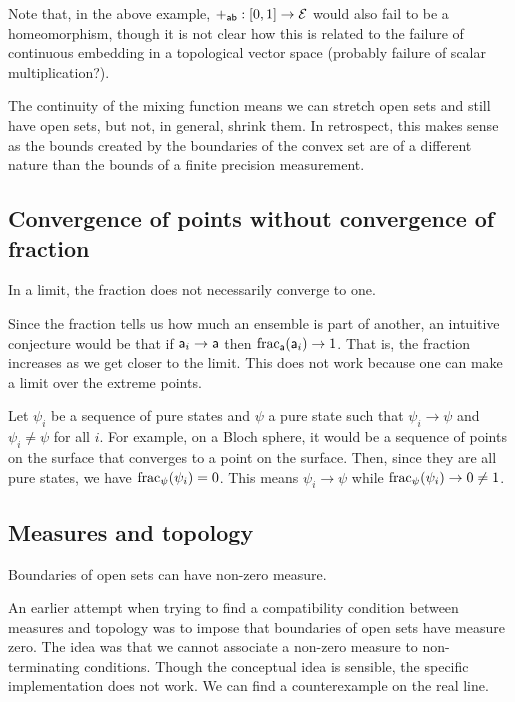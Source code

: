 Note that, in the above example, $+_{\ens[a]\ens[b]} : [0,1] \to \Ens$ would also fail to be a homeomorphism, though it is not clear how this is related to the failure of continuous embedding in a topological vector space (probably failure of scalar multiplication?).

The continuity of the mixing function means we can stretch open sets and still have open sets, but not, in general, shrink them. In retrospect, this makes sense as the bounds created by the boundaries of the convex set are of a different nature than the bounds of a finite precision measurement.

\subsection{Convergence of points without convergence of fraction}

\begin{insight}
	In a limit, the fraction does not necessarily converge to one.
\end{insight}

Since the fraction tells us how much an ensemble is part of another, an intuitive conjecture would be that if $\ens[a]_i \to \ens[a]$ then $\fraction_{\ens[a]}(\ens[a]_i) \to 1$. That is, the fraction increases as we get closer to the limit. This does not work because one can make a limit over the extreme points.

\begin{example}
	Let $\psi_i$ be a sequence of pure states and $\psi$ a pure state such that $\psi_i \to \psi$ and $\psi_i \neq \psi$ for all $i$. For example, on a Bloch sphere, it would be a sequence of points on the surface that converges to a point on the surface. Then, since they are all pure states, we have $\fraction_{\psi}(\psi_i) = 0$. This means $\psi_i \to \psi$ while $\fraction_{\psi}(\psi_i) \to 0 \neq 1$.
\end{example}

\subsection{Measures and topology}

\begin{insight}\label{pm-es-nonZeroMeasureOnBoundaries}
	Boundaries of open sets can have non-zero measure.
\end{insight}

An earlier attempt when trying to find a compatibility condition between measures and topology was to impose that boundaries of open sets have measure zero. The idea was that we cannot associate a non-zero measure to non-terminating conditions. Though the conceptual idea is sensible, the specific implementation does not work. We can find a counterexample on the real line. 

